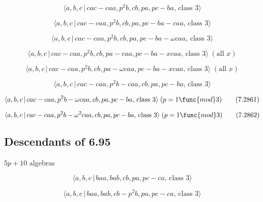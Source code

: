 \documentclass[10pt]{article}
\begin{document}
\begin{equation}
\langle a,b,c\,|\,cac-caa,p^2b,cb,pa,pc-ba,\,\text{class }3\rangle 
\tag{7.2855}
\end{equation}

\begin{equation}
\langle a,b,c\,|\,cac-caa,p^2b,cb,pa,pc-ba-caa,\,\text{class }3\rangle 
\tag{7.2856}
\end{equation}

\begin{equation}
\langle a,b,c\,|\,cac-caa,p^{2}b,cb,pa,pc-ba-\omega caa,\,\text{class }%
3\rangle  \tag{7.2857}
\end{equation}

\begin{equation}
\langle a,b,c\,|\,cac-caa,p^2b,cb,pa-caa,pc-ba-xcaa,\,\text{class }3\rangle
\;(\text{all }x)  \tag{7.2858}
\end{equation}

\begin{equation}
\langle a,b,c\,|\,cac-caa,p^{2}b,cb,pa-\omega caa,pc-ba-xcaa,\,\text{class }%
3\rangle \;(\text{all }x)  \tag{7.2859}
\end{equation}

\begin{equation}
\langle a,b,c\,|\,cac-caa,p^2b-caa,cb,pa,pc-ba,\,\text{class }3\rangle 
\tag{7.2860}
\end{equation}

\begin{equation}
\langle a,b,c\,|\,cac-caa,p^{2}b-\omega caa,cb,pa,pc-ba,\,\text{class }%
3\rangle \;(p=1\func{mod}3)  \tag{7.2861}
\end{equation}

\begin{equation}
\langle a,b,c\,|\,cac-caa,p^{2}b-\omega ^{2}caa,cb,pa,pc-ba,\,\text{class }%
3\rangle \;(p=1\func{mod}3)  \tag{7.2862}
\end{equation}

\subsection{Descendants of 6.95}

$5p+10$ algebras

\begin{equation}
\langle a,b,c\,|\,baa,bab,cb,pa,pc-ca,\,\text{class }3\rangle  \tag{7.2863}
\end{equation}

\begin{equation}
\langle a,b,c\,|\,baa,bab,cb-p^2b,pa,pc-ca,\,\text{class }3\rangle 
\tag{7.2864}
\end{equation}
\end{document}
